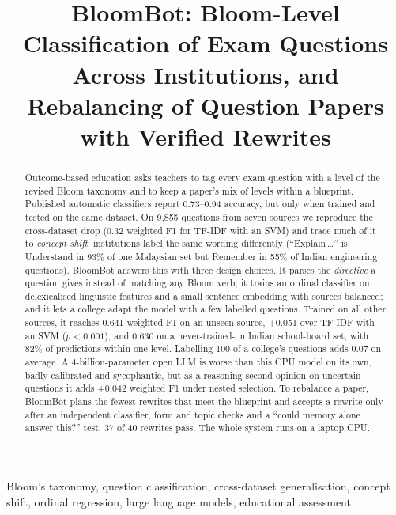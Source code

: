 \documentclass[conference]{IEEEtran}
\begin{document}
\title{BloomBot: Bloom-Level Classification of Exam Questions Across Institutions, and Rebalancing of Question Papers with Verified Rewrites}

\author{%
}

\maketitle

\begin{abstract}
Outcome-based education asks teachers to tag every exam question with a level of the revised
Bloom taxonomy and to keep a paper's mix of levels within a blueprint. Published automatic
classifiers report 0.73--0.94 accuracy, but only when trained and tested on the same dataset.
On 9,855 questions from seven sources we reproduce the cross-dataset drop (0.32 weighted F1 for
TF-IDF with an SVM) and trace much of it to \emph{concept shift}: institutions label the same
wording differently (``Explain\,\ldots'' is Understand in 93\% of one Malaysian set but
Remember in 55\% of Indian engineering questions). BloomBot answers this with three design
choices. It parses the \emph{directive} a question gives instead of matching any Bloom verb;
it trains an ordinal classifier on delexicalised linguistic features and a small sentence
embedding with sources balanced; and it lets a college adapt the model with a few labelled
questions. Trained on all other sources, it reaches 0.641 weighted F1 on an unseen source,
+0.051 over TF-IDF with an SVM ($p<0.001$), and 0.630 on a never-trained-on Indian school-board
set, with 82\% of predictions within one level. Labelling 100 of a college's questions adds
0.07 on average. A 4-billion-parameter open LLM is worse than this CPU model on its own, badly
calibrated and sycophantic, but as a reasoning second opinion on uncertain questions it adds
+0.042 weighted F1 under nested selection. To rebalance a paper, BloomBot plans the fewest
rewrites that meet the blueprint and accepts a rewrite only after an independent classifier,
form and topic checks and a ``could memory alone answer this?'' test; 37 of 40 rewrites pass.
The whole system runs on a laptop CPU.
\end{abstract}

\begin{IEEEkeywords}
Bloom's taxonomy, question classification, cross-dataset generalisation, concept shift,
ordinal regression, large language models, educational assessment
\end{IEEEkeywords}
\end{document}

